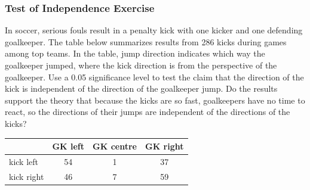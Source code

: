 \documentclass[xcolor=dvipsnames]{beamer}
\begin{document}
\begin{frame}
  \frametitle{Test of Independence Exercise}
  {\ubung} In soccer, serious fouls result in a penalty kick with one
  kicker and one defending goalkeeper. The table below summarizes
  results from 286 kicks during games among top teams.
  In the table, jump direction indicates which way
  the goalkeeper jumped, where the kick direction is from the
  perspective of the goalkeeper. Use a 0.05 significance level to test
  the claim that the direction of the kick is independent of the
  direction of the goalkeeper jump. Do the results support the theory
  that because the kicks are so fast, goalkeepers have no time to
  react, so the directions of their jumps are independent of the
  directions of the kicks?

  \medskip

  \begin{tabular}{|l|c|c|c|}\hline
               & GK left & GK centre & GK right \\ \hline
    kick left  & 54      & 1         & 37       \\ \hline
    kick right & 46      & 7         & 59       \\ \hline
  \end{tabular}
\end{frame}
\end{document}
